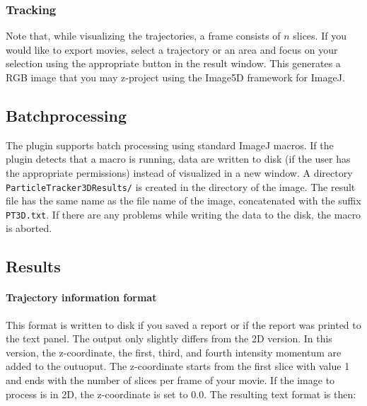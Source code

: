 \documentclass{scrartcl}
\begin{document}
\subsubsection{Tracking}
Note that, while visualizing the trajectories, a frame consists of $n$ slices. If you would like to export movies, select a trajectory or an area and focus on your selection using the appropriate button in the result window. This generates  a RGB image that you may z-project using the Image5D framework for ImageJ.

\subsection{Batchprocessing}
The plugin supports batch processing using standard ImageJ macros. If the plugin detects that a macro is running, data are written to disk (if the user has the appropriate permissions) instead of visualized in a new window. A directory \texttt{ParticleTracker3DResults/} is created in the directory of the image. The result file has the same name as the file name of the image, concatenated with the suffix \texttt{PT3D.txt}. If there are any problems while writing the data to the disk, the macro is aborted.

\subsection{Results}
\label{sec:results}
\paragraph{Trajectory information format}
This format is written to disk if you saved a report or if the report was printed to the text panel. The output only slightly differs from the 2D version. In this version, the z-coordinate, the first, third, and fourth intensity momentum are added to the outuoput. The z-coordinate starts from the first slice with value 1 and ends with the number of slices per frame of your movie. If the image to process is in 2D, the z-coordinate is set to 0.0. The resulting text format is then:
\end{document}
